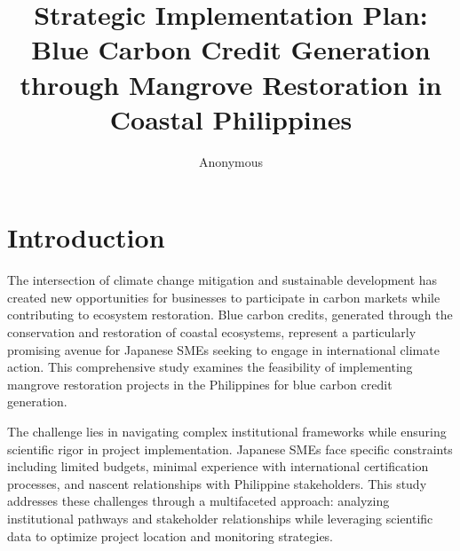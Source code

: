 \documentclass{article}
\title{Strategic Implementation Plan: Blue Carbon Credit Generation through Mangrove Restoration in Coastal Philippines}
\author{Anonymous}
\theoremstyle{plain}
\theoremstyle{definition}
\theoremstyle{remark}
\begin{document}

\section{Introduction}
The intersection of climate change mitigation and sustainable development has created new opportunities for businesses to participate in carbon markets while contributing to ecosystem restoration. Blue carbon credits, generated through the conservation and restoration of coastal ecosystems, represent a particularly promising avenue for Japanese SMEs seeking to engage in international climate action. This comprehensive study examines the feasibility of implementing mangrove restoration projects in the Philippines for blue carbon credit generation.

The challenge lies in navigating complex institutional frameworks while ensuring scientific rigor in project implementation. Japanese SMEs face specific constraints including limited budgets, minimal experience with international certification processes, and nascent relationships with Philippine stakeholders. This study addresses these challenges through a multifaceted approach: analyzing institutional pathways and stakeholder relationships while leveraging scientific data to optimize project location and monitoring strategies.
\end{document}
